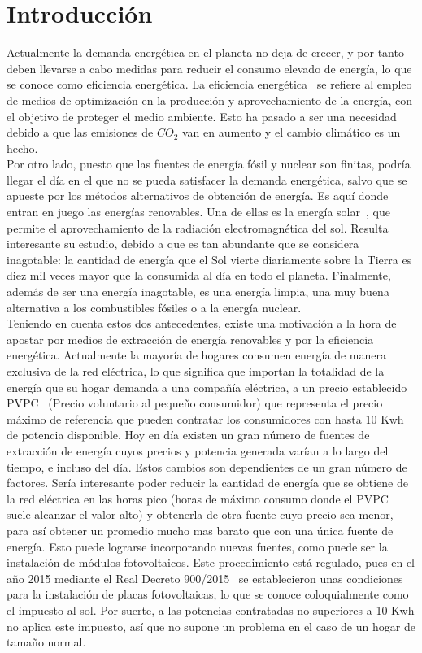 \chapter{Introducción}
\label{cap:Introduccion}
Actualmente la demanda energética en el planeta no deja de crecer, y por tanto deben llevarse a cabo medidas para reducir el consumo elevado de energía, lo que se conoce como eficiencia energética. La eficiencia energética~\cite{GarSa12} se refiere al empleo de medios de optimización en la producción y aprovechamiento de la energía, con el objetivo de proteger el medio ambiente. Esto ha pasado a ser una necesidad debido a que las emisiones de $ CO_{2} $ van en aumento y el cambio climático es un hecho.\\

Por otro lado, puesto que las fuentes de energía fósil y nuclear son finitas, podría llegar el día en el que no se pueda satisfacer la demanda energética, salvo que se apueste por los métodos alternativos de obtención de energía. Es aquí donde entran en juego las energías renovables. Una de ellas es la energía solar~\cite{Perp12}, que permite el aprovechamiento de la radiación electromagnética del sol. Resulta interesante su estudio, debido a que es tan abundante que se considera inagotable: la cantidad de energía que el Sol vierte diariamente sobre la Tierra es diez mil veces mayor que la consumida al día en todo el planeta. Finalmente, además de ser una energía inagotable, es una energía limpia, una muy buena alternativa a los combustibles fósiles o a la energía nuclear. \\

Teniendo en cuenta estos dos antecedentes, existe una motivación a la hora de apostar por medios de extracción de energía renovables y por la eficiencia energética. Actualmente la mayoría de hogares consumen energía de manera exclusiva de la red eléctrica, lo que significa que importan la totalidad de la energía que su hogar demanda a una compañía eléctrica, a un precio establecido \gls{PVPC}~\cite{Ree14} (Precio voluntario al pequeño consumidor) que representa el precio máximo de referencia que pueden contratar los consumidores con hasta 10 Kwh de potencia disponible. Hoy en día existen un gran número de fuentes de extracción de energía cuyos precios y potencia generada varían a lo largo del tiempo, e incluso del día. Estos cambios son dependientes de un gran número de factores. Sería interesante poder reducir la cantidad de energía que se obtiene de la red eléctrica en las horas pico (horas de máximo consumo donde el \gls{PVPC} suele alcanzar el valor alto) y obtenerla de otra fuente cuyo precio sea menor, para así obtener un promedio mucho mas barato que con una única fuente de energía. Esto puede lograrse incorporando nuevas fuentes, como puede ser la instalación de módulos fotovoltaicos. Este procedimiento está regulado, pues en el año 2015 mediante el Real Decreto 900/2015~\cite{Boe15} se establecieron unas condiciones para la instalación de placas fotovoltaicas, lo que se conoce coloquialmente como el impuesto al sol. Por suerte, a las potencias contratadas no superiores a 10 Kwh no aplica este impuesto, así que no supone un problema en el caso de un hogar de tamaño normal.\\

